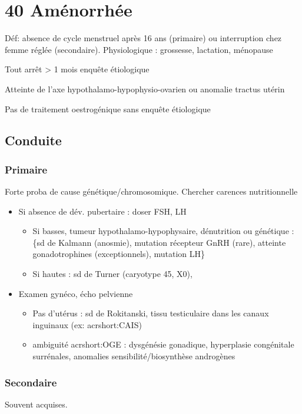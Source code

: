 \documentclass{book}
\begin{document}
\section{40 \textdagger{} Aménorrhée}
\label{sec:org342d45b}
Déf: absence de cycle menstruel après 16 ans (primaire) ou interruption chez
femme réglée (secondaire). Physiologique : grossesse, lactation, ménopause

Tout arrêt > 1 mois \thus enquête étiologique \danger

Atteinte de l'axe hypothalamo-hypophysio-ovarien ou anomalie tractus utérin

\begin{tcolorbox}
Pas de traitement oestrogénique sans enquête étiologique
\end{tcolorbox}

\subsection{Conduite}
\label{sec:org045bdbc}
\subsubsection{Primaire}
\label{sec:org77a42fc}
Forte proba de cause génétique/chromosomique. Chercher carences nutritionnelle

\begin{itemize}
\item Si absence de dév. pubertaire : doser FSH, LH
\begin{itemize}
\item Si basses, tumeur hypothalamo-hypophysaire, dénutrition ou génétique : \{sd
de Kalmann (anosmie), mutation récepteur GnRH (rare), atteinte
gonadotrophines (exceptionnels), mutation LH\}
\item Si hautes : sd de Turner (caryotype 45, X0),
\end{itemize}
\item Examen gynéco, écho pelvienne
\begin{itemize}
\item Pas d'utérus : sd de Rokitanski, tissu testiculaire dans les canaux
inguinaux (ex: acrshort:CAIS)
\item ambiguité acrshort:OGE : dysgénésie gonadique, hyperplasie congénitale surrénales,
anomalies sensibilité/biosynthèse androgènes
\end{itemize}
\end{itemize}
\subsubsection{Secondaire}
\label{sec:orge4368ca}
Souvent acquises. 
\end{document}
